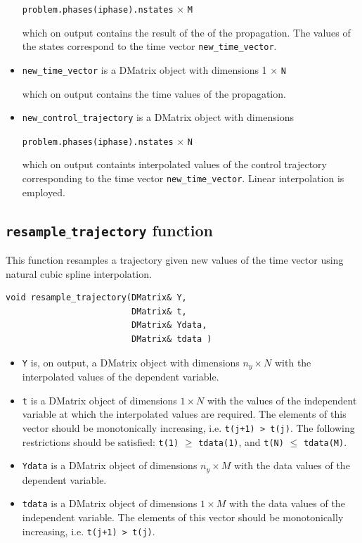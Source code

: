 \documentclass[a4paper,11pt]{report}    %
\begin{document}
\begin{itemize}
\verb|problem.phases(iphase).nstates| $\times$ \verb|M| 

\noindent which on output contains the result of the of the propagation. 
The values of the states correspond to the time vector \verb|new_time_vector|.

\item \verb|new_time_vector| is a DMatrix object with dimensions 1 $\times$ \verb|N| 

\noindent which on output contains the time values of the propagation.


\item \verb|new_control_trajectory| is a DMatrix object with dimensions 

\verb|problem.phases(iphase).nstates| $\times$ \verb|N| 

\noindent which on output containts interpolated values of the control trajectory
corresponding to the time vector \verb|new_time_vector|. Linear interpolation is
employed.
\end{itemize}



\subsection{ \texttt{resample$\_$trajectory} function }

This function resamples a trajectory given new values of the time vector using
natural cubic spline interpolation.

\begin{verbatim}
void resample_trajectory(DMatrix& Y, 
                         DMatrix& t, 
                         DMatrix& Ydata, 
                         DMatrix& tdata )
\end{verbatim}


\begin{itemize}
 \item \verb|Y| is, on output, a DMatrix object with dimensions $n_y \times N$ with the
 interpolated values of the dependent variable. 
 \item \verb|t| is a DMatrix object of dimensions  $1 \times N$ with the values of the independent
variable at which the interpolated values are required. The elements of this vector should be monotonically increasing,
i.e. \verb|t(j+1) > t(j)|. The following restrictions should be satisfied: \verb|t(1)| $\ge$ \verb|tdata(1)|, 
and \verb|t(N)| $\le$ \verb|tdata(M)|.
 \item \verb|Ydata| is a DMatrix object of dimensions  $n_y \times M$ with the data values of the dependent
variable.
 \item \verb|tdata| is a DMatrix object of dimensions $1 \times M$ with the data values of the independent
variable. The elements of this vector should be monotonically increasing,
i.e. \verb|t(j+1) > t(j)|.
\end{itemize}
\end{document}
